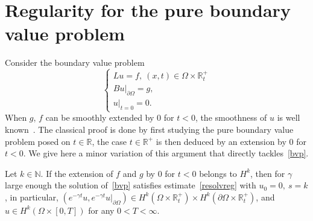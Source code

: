\documentclass[AHL,Unicode,longabstracts,published]{cedram}
\newcommand{\R}{\mathbb{R}}
\newcommand{\N}{\mathbb{N}}
\newcommand{\N}{\mathbb{N}}
\begin{document}
\section{Regularity for the pure boundary value problem}\label{sect3}

Consider the boundary value problem
\begin{equation}\label{bvp}
\left\{
\begin{array}{ll}
Lu=f,\ (x,t)\in \Omega \times \R_t^+\\
Bu|_{\partial\Omega}=g,\\
u|_{t=0}=0.
\end{array}
\right.
\end{equation}
When $g$, $f$ can be smoothly extended by $0$ for $t<0$, the smoothness of $u$ is well known~\cite{ChaPi,Tartakoff}. The classical proof is done by first studying the pure boundary value problem posed on $t\in \R$, the case $t\in \R^+$ is then deduced by an extension by $0$ for $t<0$. We give here a minor variation of this argument that directly tackles~\eqref{bvp}.

\begin{prop}\label{regBVP}
Let $k\in \N$. If the extension of $f$ and $g$ by $0$ for $t<0$ belongs to $H^k$, then for $\gamma$ large enough the solution of~\eqref{bvp} satisfies estimate~\eqref{resolvreg} with $u_0=0,\ s=k$, in particular, $(e^{-\gamma t}u,e^{-\gamma t}u|_{\partial\Omega})\in H^k(\Omega\times \R^+_t)\times H^k(\partial\Omega\times \R_t^+)$, and $u\in H^k(\Omega\times [0,T])$ for any $0<T<\infty$.
\end{prop}
\end{document}
